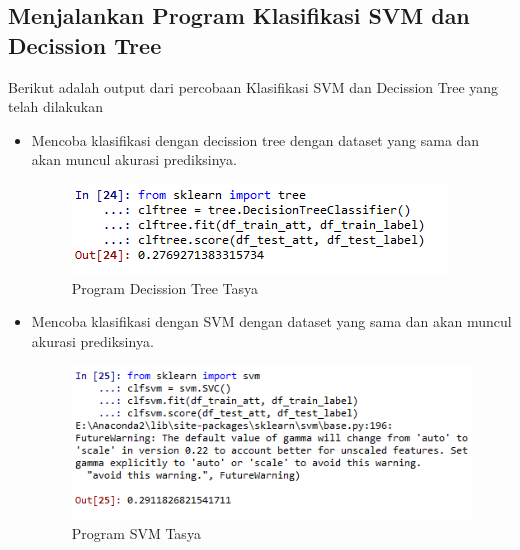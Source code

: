 \subsection{Menjalankan Program  Klasifikasi SVM dan Decission Tree}
Berikut adalah output dari percobaan  Klasifikasi SVM dan Decission Tree yang telah dilakukan
\begin{itemize}
\item Mencoba klasifikasi dengan decission tree dengan dataset yang sama dan akan muncul akurasi prediksinya.
\begin{figure}[ht]
\centering
\includegraphics[scale=0.5]{figures/tree1.png}
\caption{Program Decission Tree Tasya}
\label{Praktek}
\end{figure}

\item Mencoba klasifikasi dengan SVM dengan dataset yang sama dan akan muncul akurasi prediksinya.
\begin{figure}[ht]
\centering
\includegraphics[scale=0.5]{figures/svm1.png}
\caption{Program SVM Tasya}
\label{Praktek}
\end{figure}
\end{itemize}

